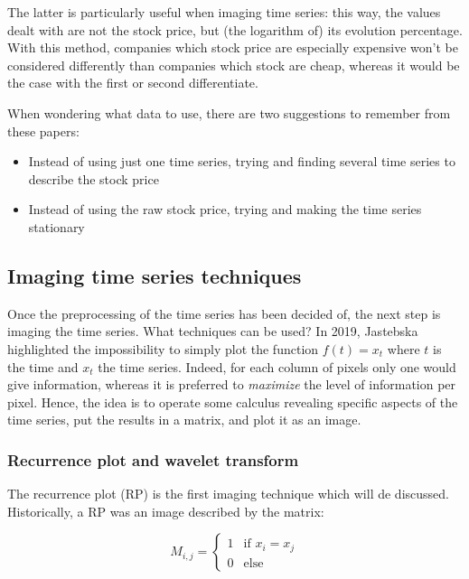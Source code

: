 \documentclass[11pt]{article}
\begin{document}
\begin{onehalfspace}
The latter is particularly useful when imaging time series: this way, the values dealt with are not the stock price, but (the logarithm of) its evolution percentage. With this method, companies which stock price are especially expensive won't be considered differently than companies which stock are cheap, whereas it would be the case with the first or second differentiate.

When wondering what data to use, there are two suggestions to remember from these papers:

\begin{itemize}
    \item Instead of using just one time series, trying and finding several time series to describe the stock price
    \item Instead of using the raw stock price, trying and making the time series stationary
\end{itemize}

\subsection{Imaging time series techniques}
\label{sec:LR_image}

Once the preprocessing of the time series has been decided of, the next step is imaging the time series. What techniques can be used? In 2019, Jastebska \cite{jastrzebska} highlighted the impossibility to simply plot the function $f(t) = x_t$ where $t$ is the time and $x_t$ the time series. Indeed, for each column of pixels only one would give information, whereas it is preferred to \emph{maximize} the level of information per pixel. Hence, the idea is to operate some calculus revealing specific aspects of the time series, put the results in a matrix, and plot it as an image.

\subsubsection{Recurrence plot and wavelet transform}

The recurrence plot (RP) is the first imaging technique which will de discussed. Historically, a RP was an image described by the matrix: 

\begin{equation}
    M_{i,j} = \begin{cases}
        1 & \text{if } x_i = x_j \\
        0 & \text{else}
    \end{cases}
\end{equation}


\end{onehalfspace}
\end{document}
